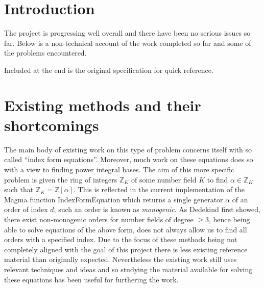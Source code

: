 \documentclass[11pt,a4paper]{article}
\begin{document}
\maketitle
\section*{Introduction}
The project is progressing well overall and there have been no serious issues so far.
Below is a non-technical account of the work completed so far and some of the problems encountered.

Included at the end is the original specification for quick reference.

\section*{Existing methods and their shortcomings}
The main body of existing work on this type of problem concerns itself with so called ``index form equations''.
Moreover, much work on these equations does so with a view to finding power integral bases.
The aim of this more specific problem is given the ring of integers $\mathbb{Z}_K$ of some number field $K$ to find $\alpha\in\mathbb{Z}_K$ such that $\mathbb{Z}_K = \mathbb{Z}[\alpha]$.
This is reflected in the current implementation of the Magma function IndexFormEquation which returns a single generator $\alpha$ of an order of index $d$, such an order is known as \emph{monogenic}.
As Dedekind first showed, there exist non-monogenic orders for number fields of degree $\ge 3$, hence being able to solve equations of the above form, does not always allow us to find all orders with a specified index.
Due to the focus of these methods being not completely aligned with the goal of this project there is less existing reference material than originally expected.
Nevertheless the existing work still uses relevant techniques and ideas and so studying the material available for solving these equations has been useful for furthering the work.
\end{document}
